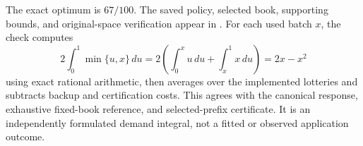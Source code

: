 The exact optimum is $67/100$. The saved policy, selected book, supporting bounds, and original-space verification appear in . For each used batch $x$, the check computes
\[
 2\int_0^1\min\{u,x\}\,du
 =2\left(\int_0^x u\,du+\int_x^1 x\,du\right)
 =2x-x^2
\]
using exact rational arithmetic, then averages over the implemented lotteries and subtracts backup and certification costs. This agrees with the canonical response, exhaustive fixed-book reference, and selected-prefix certificate. It is an independently formulated demand integral, not a fitted or observed application outcome.


